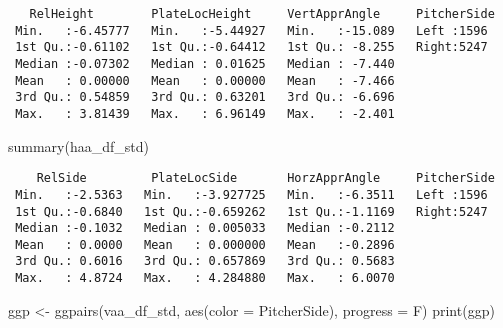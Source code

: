 \documentclass[
  letterpaper,
  DIV=11,
  numbers=noendperiod]{scrartcl}
\newenvironment{Shaded}{\begin{snugshade}}{\end{snugshade}}
\newcommand{\AttributeTok}[1]{\textcolor[rgb]{0.40,0.45,0.13}{#1}}
\newcommand{\FunctionTok}[1]{\textcolor[rgb]{0.28,0.35,0.67}{#1}}
\newcommand{\NormalTok}[1]{\textcolor[rgb]{0.00,0.23,0.31}{#1}}
\newcommand{\OtherTok}[1]{\textcolor[rgb]{0.00,0.23,0.31}{#1}}
\newcommand{\SpecialCharTok}[1]{\textcolor[rgb]{0.37,0.37,0.37}{#1}}
\begin{document}
\begin{Shaded}
\end{Shaded}

\begin{verbatim}
   RelHeight        PlateLocHeight     VertApprAngle     PitcherSide 
 Min.   :-6.45777   Min.   :-5.44927   Min.   :-15.089   Left :1596  
 1st Qu.:-0.61102   1st Qu.:-0.64412   1st Qu.: -8.255   Right:5247  
 Median :-0.07302   Median : 0.01625   Median : -7.440               
 Mean   : 0.00000   Mean   : 0.00000   Mean   : -7.466               
 3rd Qu.: 0.54859   3rd Qu.: 0.63201   3rd Qu.: -6.696               
 Max.   : 3.81439   Max.   : 6.96149   Max.   : -2.401               
\end{verbatim}

\begin{Shaded}
\begin{Highlighting}[]
\FunctionTok{summary}\NormalTok{(haa\_df\_std)}
\end{Highlighting}
\end{Shaded}

\begin{verbatim}
    RelSide         PlateLocSide       HorzApprAngle     PitcherSide 
 Min.   :-2.5363   Min.   :-3.927725   Min.   :-6.3511   Left :1596  
 1st Qu.:-0.6840   1st Qu.:-0.659262   1st Qu.:-1.1169   Right:5247  
 Median :-0.1032   Median : 0.005033   Median :-0.2112               
 Mean   : 0.0000   Mean   : 0.000000   Mean   :-0.2896               
 3rd Qu.: 0.6016   3rd Qu.: 0.657869   3rd Qu.: 0.5683               
 Max.   : 4.8724   Max.   : 4.284880   Max.   : 6.0070               
\end{verbatim}

\begin{Shaded}
\begin{Highlighting}[]
\NormalTok{ggp }\OtherTok{\textless{}{-}} \FunctionTok{ggpairs}\NormalTok{(vaa\_df\_std, }
        \FunctionTok{aes}\NormalTok{(}\AttributeTok{color =}\NormalTok{ PitcherSide),}
        \AttributeTok{progress =}\NormalTok{ F)}
\FunctionTok{print}\NormalTok{(ggp)}
\end{Highlighting}
\end{Shaded}
\end{document}
